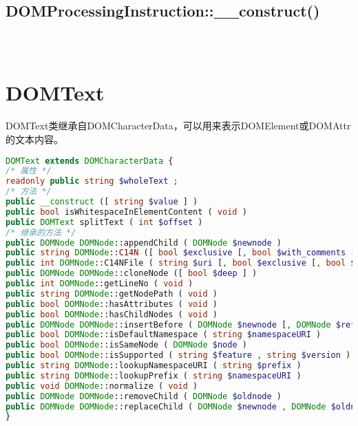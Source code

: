 \subsection{DOMProcessingInstruction::\_\_construct()}

\begin{lstlisting}[language=PHP]

\end{lstlisting}


\begin{lstlisting}[language=PHP]

\end{lstlisting}


\begin{lstlisting}[language=PHP]

\end{lstlisting}
\section{DOMText}

DOMText类继承自DOMCharacterData，可以用来表示DOMElement或DOMAttr的文本内容。

\begin{lstlisting}[language=PHP]
DOMText extends DOMCharacterData {
/* 属性 */
readonly public string $wholeText ;
/* 方法 */
public __construct ([ string $value ] )
public bool isWhitespaceInElementContent ( void )
public DOMText splitText ( int $offset )
/* 继承的方法 */
public DOMNode DOMNode::appendChild ( DOMNode $newnode )
public string DOMNode::C14N ([ bool $exclusive [, bool $with_comments [, array $xpath [, array $ns_prefixes ]]]] )
public int DOMNode::C14NFile ( string $uri [, bool $exclusive [, bool $with_comments [, array $xpath [, array $ns_prefixes ]]]] )
public DOMNode DOMNode::cloneNode ([ bool $deep ] )
public int DOMNode::getLineNo ( void )
public string DOMNode::getNodePath ( void )
public bool DOMNode::hasAttributes ( void )
public bool DOMNode::hasChildNodes ( void )
public DOMNode DOMNode::insertBefore ( DOMNode $newnode [, DOMNode $refnode ] )
public bool DOMNode::isDefaultNamespace ( string $namespaceURI )
public bool DOMNode::isSameNode ( DOMNode $node )
public bool DOMNode::isSupported ( string $feature , string $version )
public string DOMNode::lookupNamespaceURI ( string $prefix )
public string DOMNode::lookupPrefix ( string $namespaceURI )
public void DOMNode::normalize ( void )
public DOMNode DOMNode::removeChild ( DOMNode $oldnode )
public DOMNode DOMNode::replaceChild ( DOMNode $newnode , DOMNode $oldnode )
}
\end{lstlisting}

